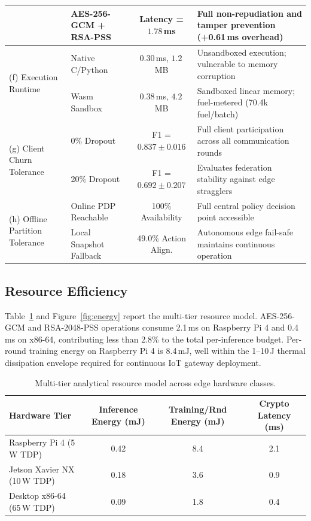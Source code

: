 \documentclass[sn-mathphys,Numbered]{sn-jnl}
\begin{document}
\begin{table}[htbp]
\begin{tabularx}{\textwidth}{@{}llcX@{}}
                                         & AES-256-GCM + RSA-PSS & Latency = $1.78$\,ms & Full non-repudiation and tamper prevention (+0.61\,ms overhead) \\
\midrule
\multirow{2}{*}{(f) Execution Runtime} & Native C/Python & $0.30$\,ms, $1.2$\,MB & Unsandboxed execution; vulnerable to memory corruption \\
                                       & Wasm Sandbox    & $0.38$\,ms, $4.2$\,MB & Sandboxed linear memory; fuel-metered (70.4k fuel/batch) \\
\midrule
\multirow{2}{*}{(g) Client Churn Tolerance} & 0\% Dropout  & F1 = $0.837 \pm 0.016$ & Full client participation across all communication rounds \\
                                  & 20\% Dropout & F1 = $0.692 \pm 0.207$ & Evaluates federation stability against edge stragglers \\
\midrule
\multirow{2}{*}{(h) Offline Partition Tolerance} & Online PDP Reachable & 100\% Availability & Full central policy decision point accessible \\
                                         & Local Snapshot Fallback & 49.0\% Action Align. & Autonomous edge fail-safe maintains continuous operation \\
\bottomrule
\end{tabularx}
\end{table}

\subsection{Resource Efficiency}\label{sec:resources}
Table~\ref{tab:energy} and Figure~\ref{fig:energy} report the multi-tier resource model. AES-256-GCM and RSA-2048-PSS operations consume 2.1\,ms on Raspberry Pi 4 and 0.4\,ms on x86-64, contributing less than 2.8\% to the total per-inference budget. Per-round training energy on Raspberry Pi 4 is 8.4\,mJ, well within the 1--10\,J thermal dissipation envelope required for continuous IoT gateway deployment.

\begin{table}[htbp]
\caption{Multi-tier analytical resource model across edge hardware classes.}\label{tab:energy}
\centering\small
\begin{tabular}{@{}lccc@{}}
\toprule
\textbf{Hardware Tier} & \textbf{Inference Energy (mJ)} & \textbf{Training/Rnd Energy (mJ)} & \textbf{Crypto Latency (ms)} \\
\midrule
Raspberry Pi 4 (5\,W TDP)   & 0.42 & 8.4 & 2.1 \\
Jetson Xavier NX (10\,W TDP)& 0.18 & 3.6 & 0.9 \\
Desktop x86-64 (65\,W TDP)  & 0.09 & 1.8 & 0.4 \\
\bottomrule
\end{tabular}
\end{table}
\end{document}
